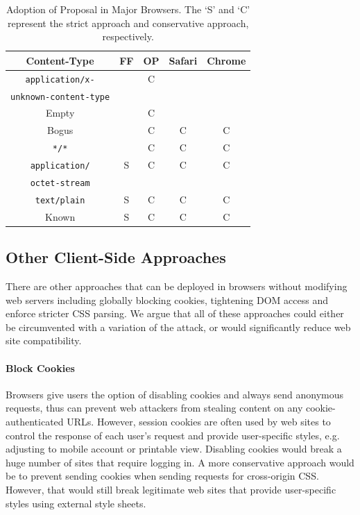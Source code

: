 \documentclass{acm_proc_article-sp}
\begin{document}
\begin{table}
\centering
\begin{tabular}{|c|c|c|c|c|} \hline
Content-Type&FF&OP&Safari&Chrome\\ \hline
\texttt{application/x-}&&C&&\\ 
\texttt{unknown-content-type}&&&&\\ \hline
Empty&&C&&\\ \hline
Bogus&&C&C&C \\ \hline
\texttt{*/*}&&C&C&C \\ \hline
\texttt{application/}&S&C&C&C\\ 
\texttt{octet-stream}&&&&\\ \hline
\texttt{text/plain}&S&C&C&C\\ \hline
Known&S&C&C&C\\
\hline\end{tabular}
\caption{Adoption of Proposal in Major Browsers. The `S' and `C' represent the strict approach and conservative approach, respectively.}
\label{table:adoption}
\end{table}

\subsection{Other Client-Side Approaches}
There are other approaches that can be deployed in browsers without modifying web servers including globally blocking cookies, tightening DOM access and enforce stricter CSS parsing.  We argue that all of these approaches could either be circumvented with a variation of the attack, or would significantly reduce web site compatibility.

\paragraph{Block Cookies}
Browsers give users the option of disabling cookies and always send anonymous requests, thus can prevent web attackers from stealing content on any cookie-authenticated URLs. However, session cookies are often used by web sites to control the response of each user's request and provide user-specific styles, e.g. adjusting to mobile account or printable view. Disabling cookies would break a huge number of sites that require logging in. A more conservative approach would be to prevent sending cookies when sending requests for cross-origin CSS. However, that would still break legitimate web sites that provide user-specific styles using external style sheets.
\end{document}

